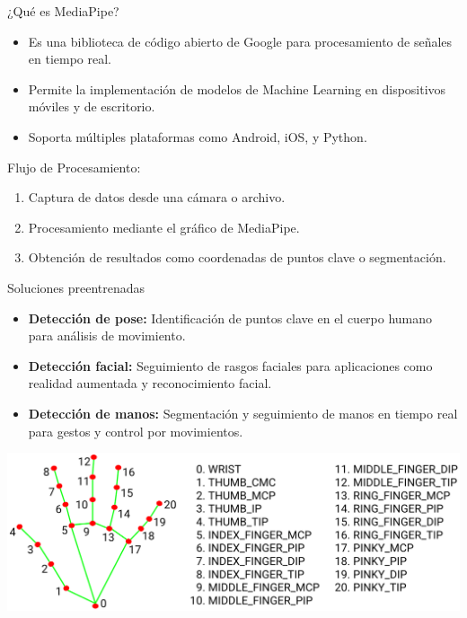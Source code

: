 
\begin{frame}{¿Qué es MediaPipe?}
    \begin{itemize}
        \item Es una biblioteca de código abierto de Google para procesamiento de señales en tiempo real.
        \item Permite la implementación de modelos de Machine Learning en dispositivos móviles y de escritorio.
        \item Soporta múltiples plataformas como Android, iOS, y Python.
    \end{itemize}
    Flujo de Procesamiento:
    \begin{enumerate}
        \item Captura de datos desde una cámara o archivo.
        \item Procesamiento mediante el gráfico de MediaPipe.
        \item Obtención de resultados como coordenadas de puntos clave o segmentación.
    \end{enumerate}

\end{frame}

\begin{frame}{Soluciones preentrenadas}
    \begin{itemize}
        \item \textbf{Detección de pose:} Identificación de puntos clave en el cuerpo humano para análisis de movimiento.
        \item \textbf{Detección facial:} Seguimiento de rasgos faciales para aplicaciones como realidad aumentada y reconocimiento facial.
        \item \textbf{Detección de manos:} Segmentación y seguimiento de manos en tiempo real para gestos y control por movimientos.
    \end{itemize}
    \begin{center}
        \includegraphics[width=0.6\linewidth]{01_MediaPipe/hand_landmarks.png}
    \end{center}
\end{frame}

